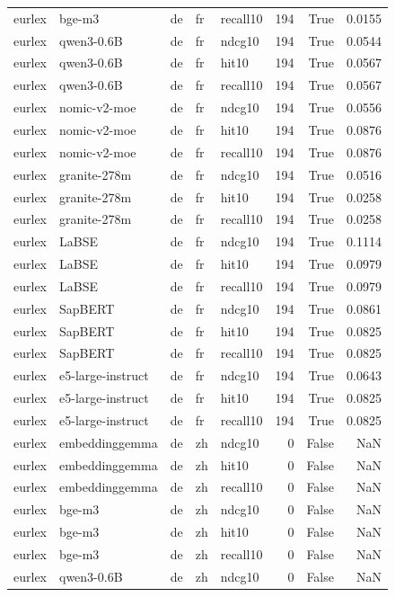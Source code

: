 \begin{tabular}{lllllrrr}
eurlex & bge-m3 & de & fr & recall10 & 194 & True & 0.0155 \\
eurlex & qwen3-0.6B & de & fr & ndcg10 & 194 & True & 0.0544 \\
eurlex & qwen3-0.6B & de & fr & hit10 & 194 & True & 0.0567 \\
eurlex & qwen3-0.6B & de & fr & recall10 & 194 & True & 0.0567 \\
eurlex & nomic-v2-moe & de & fr & ndcg10 & 194 & True & 0.0556 \\
eurlex & nomic-v2-moe & de & fr & hit10 & 194 & True & 0.0876 \\
eurlex & nomic-v2-moe & de & fr & recall10 & 194 & True & 0.0876 \\
eurlex & granite-278m & de & fr & ndcg10 & 194 & True & 0.0516 \\
eurlex & granite-278m & de & fr & hit10 & 194 & True & 0.0258 \\
eurlex & granite-278m & de & fr & recall10 & 194 & True & 0.0258 \\
eurlex & LaBSE & de & fr & ndcg10 & 194 & True & 0.1114 \\
eurlex & LaBSE & de & fr & hit10 & 194 & True & 0.0979 \\
eurlex & LaBSE & de & fr & recall10 & 194 & True & 0.0979 \\
eurlex & SapBERT & de & fr & ndcg10 & 194 & True & 0.0861 \\
eurlex & SapBERT & de & fr & hit10 & 194 & True & 0.0825 \\
eurlex & SapBERT & de & fr & recall10 & 194 & True & 0.0825 \\
eurlex & e5-large-instruct & de & fr & ndcg10 & 194 & True & 0.0643 \\
eurlex & e5-large-instruct & de & fr & hit10 & 194 & True & 0.0825 \\
eurlex & e5-large-instruct & de & fr & recall10 & 194 & True & 0.0825 \\
eurlex & embeddinggemma & de & zh & ndcg10 & 0 & False & NaN \\
eurlex & embeddinggemma & de & zh & hit10 & 0 & False & NaN \\
eurlex & embeddinggemma & de & zh & recall10 & 0 & False & NaN \\
eurlex & bge-m3 & de & zh & ndcg10 & 0 & False & NaN \\
eurlex & bge-m3 & de & zh & hit10 & 0 & False & NaN \\
eurlex & bge-m3 & de & zh & recall10 & 0 & False & NaN \\
eurlex & qwen3-0.6B & de & zh & ndcg10 & 0 & False & NaN \\

\end{tabular}
